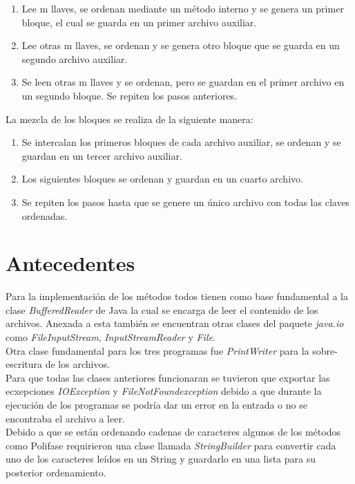 \documentclass{article}
\begin{document}
		\begin{enumerate}
			\item Lee m llaves, se ordenan mediante un método interno y se genera un primer bloque, el cual se guarda en un primer archivo auxiliar.
			\item Lee otras m llaves, se ordenan y se genera otro bloque que se guarda en un segundo archivo auxiliar.
			\item Se leen otras m llaves y se ordenan, pero se guardan en el primer archivo en un segundo bloque. Se repiten los pasos anteriores.
		\end{enumerate} 
		
		La mezcla de los bloques se realiza de la siguiente manera:
		
		\begin{enumerate}
			\item Se intercalan los primeros bloques de cada archivo auxiliar, se ordenan y se guardan en un tercer archivo auxiliar.
			\item Los siguientes bloques se ordenan y guardan en un cuarto archivo.
			\item Se repiten los pasos hasta que se genere un único archivo con todas las claves ordenadas.
		\end{enumerate}
	
	\section{Antecedentes}
	Para la implementación de los métodos todos tienen como base fundamental a la clase \textit{BufferedReader} de Java la cual se encarga de
	leer el contenido de los archivos. Anexada a esta también se encuentran otras clases del paquete \textit{java.io} como \textit{FileInputStream}, \textit{InputStreamReader}
	y \textit{File}.\\
	
	Otra clase fundamental para los tres programas fue \textit{PrintWriter} para la sobre-escritura de los archivos.\\
	
	Para que todas las clases anteriores funcionaran se tuvieron que exportar las ecxepciones \textit{IOException} y \textit{FileNotFoundexception} debido a que durante
	la ejecución de los programas se podría dar un error en la entrada o no se encontraba el archivo a leer.\\
	
	Debido a que se están ordenando cadenas de caracteres algunos de los métodos como Polifase requirieron una clase llamada \textit{StringBuilder} para convertir cada
	uno de los caracteres leídos en un String y guardarlo en una lista para su posterior ordenamiento.\\
	
\end{document}
